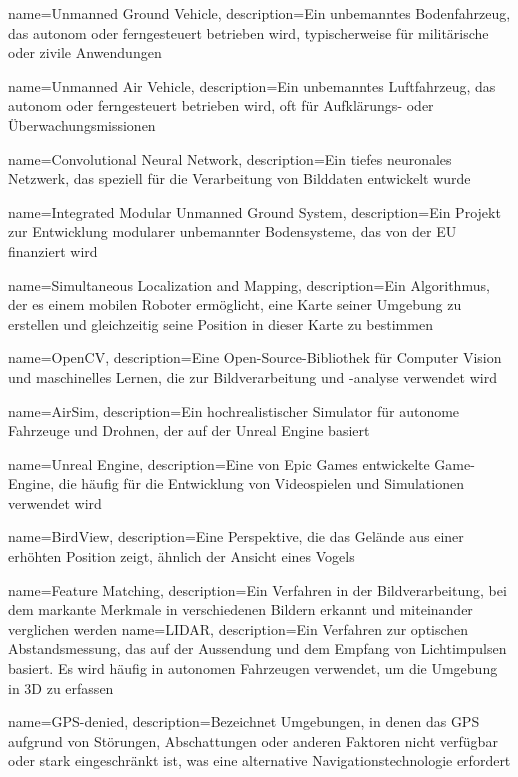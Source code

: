 {
    name=Unmanned Ground Vehicle,
    description={Ein unbemanntes Bodenfahrzeug, das autonom oder ferngesteuert betrieben wird, typischerweise für militärische oder zivile Anwendungen}
}

{
    name=Unmanned Air Vehicle,
    description={Ein unbemanntes Luftfahrzeug, das autonom oder ferngesteuert betrieben wird, oft für Aufklärungs- oder Überwachungsmissionen}
}

{
    name=Convolutional Neural Network,
    description={Ein tiefes neuronales Netzwerk, das speziell für die Verarbeitung von Bilddaten entwickelt wurde}
}

{
    name=Integrated Modular Unmanned Ground System,
    description={Ein Projekt zur Entwicklung modularer unbemannter Bodensysteme, das von der EU finanziert wird}
}

{
    name=Simultaneous Localization and Mapping,
    description={Ein Algorithmus, der es einem mobilen Roboter ermöglicht, eine Karte seiner Umgebung zu erstellen und gleichzeitig seine Position in dieser Karte zu bestimmen}
}

{
    name=OpenCV,
    description={Eine Open-Source-Bibliothek für Computer Vision und maschinelles Lernen, die zur Bildverarbeitung und -analyse verwendet wird}
}

{
    name=AirSim,
    description={Ein hochrealistischer Simulator für autonome Fahrzeuge und Drohnen, der auf der Unreal Engine basiert}
}

{
    name=Unreal Engine,
    description={Eine von Epic Games entwickelte Game-Engine, die häufig für die Entwicklung von Videospielen und Simulationen verwendet wird}
}

{
    name=BirdView,
    description={Eine Perspektive, die das Gelände aus einer erhöhten Position zeigt, ähnlich der Ansicht eines Vogels}
}

{
    name=Feature Matching,
    description={Ein Verfahren in der Bildverarbeitung, bei dem markante Merkmale in verschiedenen Bildern erkannt und miteinander verglichen werden}
}
{
    name=LIDAR,
    description={Ein Verfahren zur optischen Abstandsmessung, das auf der Aussendung und dem Empfang von Lichtimpulsen basiert. Es wird häufig in autonomen Fahrzeugen verwendet, um die Umgebung in 3D zu erfassen}
}

{
    name=GPS-denied,
    description={Bezeichnet Umgebungen, in denen das \ac{GPS} aufgrund von Störungen, Abschattungen oder anderen Faktoren nicht verfügbar oder stark eingeschränkt ist, was eine alternative Navigationstechnologie erfordert}
}

